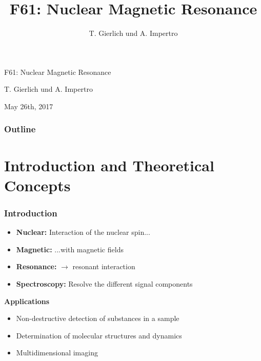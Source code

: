 \documentclass[aspectratio=169]{beamer}
\title{F61: Nuclear Magnetic Resonance}
\author{T. Gierlich und A. Impertro}
\date{}
\begin{document}
\begin{frame}
  \begin{center}
    {\LARGE F61: Nuclear Magnetic Resonance}
    
    \bigskip
    
    {\large T. Gierlich und A. Impertro}
        
    \bigskip
   
    {\large May 26th, 2017}
  \end{center}
\end{frame}

\begin{frame}
	\frametitle{Outline}
  	\tableofcontents
\end{frame}

\section{Introduction and Theoretical Concepts}

\begin{frame}
	\frametitle{Introduction}
	
	\begin{itemize}
		\item \textbf{Nuclear:} Interaction of the nuclear spin...
		\item \textbf{Magnetic:} ...with magnetic fields
		\item \textbf{Resonance:} $\rightarrow$ resonant interaction
		\item \textbf{Spectroscopy:} Resolve the different signal components
	\end{itemize}

	\bigskip
	
	\textbf{Applications}
	\begin{itemize}
		\item Non-destructive detection of substances in a sample
		\item Determination of molecular structures and dynamics
		\item Multidimensional imaging
	\end{itemize}
\end{frame}
\end{document}
